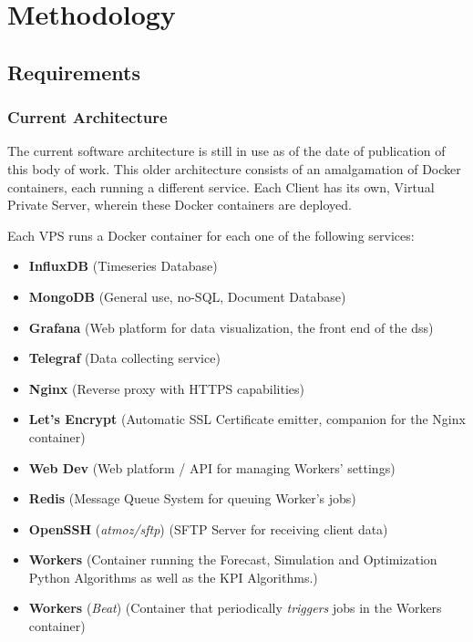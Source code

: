 \chapter{Methodology}
\label{methodology}

\section{Requirements}
\label{methodology:s:requirements}

\subsection{Current Architecture}
\label{methodology:ss:current-architecture}

The current software architecture is still in use as of the date of publication of this body of work. This older architecture consists of an amalgamation of Docker containers, each running a different service. Each Client has its own, Virtual Private Server, wherein these Docker containers are deployed. 

Each VPS runs a Docker container for each one of the following services:

\begin{itemize}

\item \textbf{InfluxDB} (Timeseries Database)
\item \textbf{MongoDB} (General use, no-SQL, Document Database)
\item \textbf{Grafana} (Web platform for data visualization, the front end of the \gls{dss})
\item \textbf{Telegraf} (Data collecting service)
\item \textbf{Nginx} (Reverse proxy with HTTPS capabilities)
\item \textbf{Let's Encrypt} (Automatic SSL Certificate emitter, companion for the Nginx container)
\item \textbf{Web Dev} (Web platform / API for managing Workers' settings)
\item \textbf{Redis} (Message Queue System for queuing Worker's jobs)
\item \textbf{OpenSSH} (\textit{atmoz/sftp}) (SFTP Server for receiving client data)
\item \textbf{Workers} (Container running the Forecast, Simulation and Optimization Python Algorithms as well as the KPI Algorithms.)
\item \textbf{Workers} (\textit{Beat}) (Container that periodically \textit{triggers} jobs in the Workers container)

\end{itemize}

